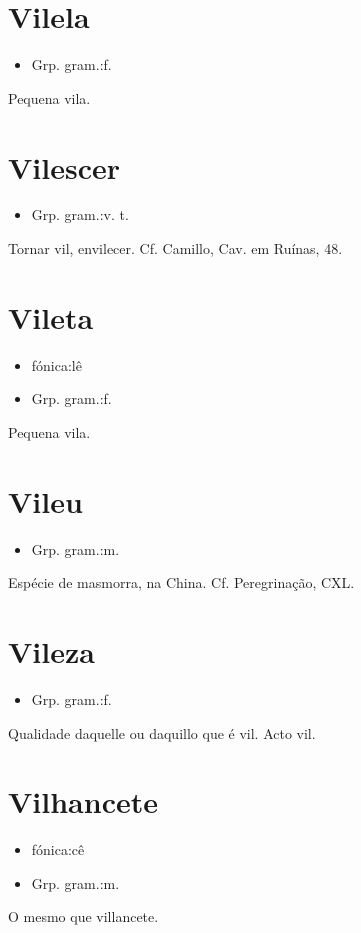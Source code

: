 \documentclass{article}
\begin{document}
\section{Vilela}
\begin{itemize}
\item {Grp. gram.:f.}
\end{itemize}
Pequena vila.
\section{Vilescer}
\begin{itemize}
\item {Grp. gram.:v. t.}
\end{itemize}
Tornar vil, envilecer. Cf. Camillo, \textunderscore Cav. em Ruínas\textunderscore , 48.
\section{Vileta}
\begin{itemize}
\item {fónica:lê}
\end{itemize}
\begin{itemize}
\item {Grp. gram.:f.}
\end{itemize}
Pequena vila.
\section{Vileu}
\begin{itemize}
\item {Grp. gram.:m.}
\end{itemize}
Espécie de masmorra, na China. Cf. \textunderscore Peregrinação\textunderscore , CXL.
\section{Vileza}
\begin{itemize}
\item {Grp. gram.:f.}
\end{itemize}
Qualidade daquelle ou daquillo que é vil.
Acto vil.
\section{Vilhancete}
\begin{itemize}
\item {fónica:cê}
\end{itemize}
\begin{itemize}
\item {Grp. gram.:m.}
\end{itemize}
O mesmo que \textunderscore villancete\textunderscore .
\end{document}
